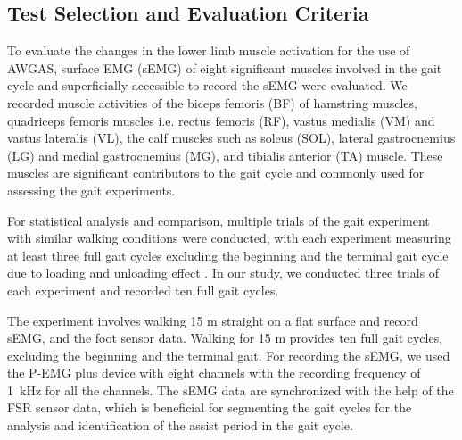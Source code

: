 \documentclass[paper,JRM,paper]{jaciiiarticle}
\begin{document}
\subsection{Test Selection and Evaluation Criteria}
To evaluate the changes in the lower limb muscle activation for the use of AWGAS, surface EMG (sEMG) of eight significant muscles involved in the gait cycle and superficially accessible to record the sEMG were evaluated. We recorded muscle activities of the biceps femoris (BF) of hamstring muscles, quadriceps femoris muscles i.e. rectus femoris (RF), vastus medialis (VM) and vastus lateralis (VL), the calf muscles such as soleus (SOL), lateral gastrocnemius (LG) and medial gastrocnemius (MG), and tibialis anterior (TA) muscle. These muscles are significant contributors to the gait cycle and commonly used for assessing the gait experiments. 

For statistical analysis and comparison, multiple trials of the gait experiment with similar walking conditions were conducted, with each experiment measuring at least three full gait cycles excluding the beginning and the terminal gait cycle due to loading and unloading effect \cite{22}. In our study, we conducted three trials of each experiment and recorded ten full gait cycles. 

The experiment involves walking 15 m straight on a flat surface and record sEMG, and the foot sensor data. Walking for 15 m provides ten full gait cycles, excluding the beginning and the terminal gait.  For recording the sEMG, we used the P-EMG plus device with eight channels with the recording frequency of \SI{1}{\kilo\hertz} for all the channels. The sEMG data are synchronized with the help of the FSR sensor data, which is beneficial for segmenting the gait cycles for the analysis and identification of the assist period in the gait cycle. 
\end{document}

